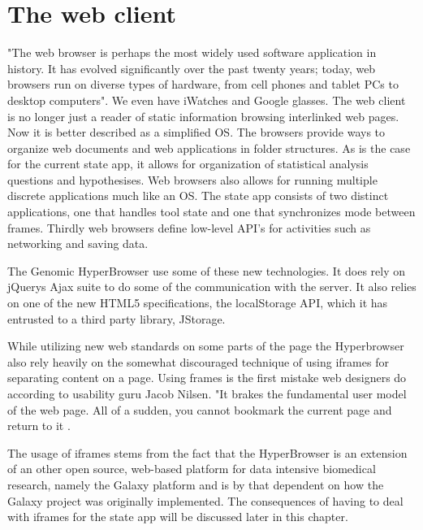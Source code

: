 \documentclass[english]{ifimaster}
\begin{document}
\section{The web client}
"The web browser is perhaps the most widely used software application in history. It has evolved significantly over the past twenty years; today, web browsers run on diverse types of hardware, from cell phones and tablet PCs to desktop computers"\parencite[p. 2]{gross}. We even have iWatches and Google glasses. The web client is no longer just a reader of static information browsing interlinked web pages. Now it is better described as a simplified OS\parencite[p.310]{flanagan}. The browsers provide ways to organize web documents and web applications in folder structures. As is the case for the current state app, it allows for organization of statistical analysis questions and hypothesises. Web browsers also allows for running multiple discrete applications much like an OS. The state app consists of two distinct applications, one that handles tool state and one that synchronizes mode between frames. Thirdly web browsers define low-level API's for activities such as networking and saving data. 

The Genomic HyperBrowser use some of these new technologies. It does rely on jQuerys Ajax suite to do some of the communication with the server. It also relies on one of the new HTML5 specifications, the localStorage API, which it has entrusted to a third party library, JStorage. 

While utilizing new web standards on some parts of the page the Hyperbrowser also rely heavily on the somewhat discouraged technique of using iframes for separating content on a page. Using frames is the first mistake web designers do according to usability guru Jacob Nilsen. "It brakes the fundamental user model of the web page. All of a sudden, you cannot bookmark the current page and return to it \parencite{nielsen1997user}.

The usage of iframes stems from the fact that the HyperBrowser is an extension of an other open source, web-based platform for data intensive biomedical research, namely the Galaxy platform and is by that dependent on how the Galaxy project was originally implemented. The consequences of having to deal with iframes for the state app will be discussed later in this chapter.
\end{document}
